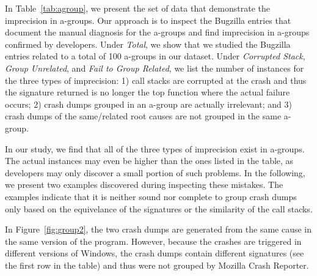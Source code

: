 \begin{table}[!htb]
\centering
\caption{Imprecision in a-Groups\label{tab:agroup}}

\end{table}

In Table~\ref{tab:agroup}, we present the set of data that demonstrate the imprecision in a-groups. Our approach is to inspect the Bugzilla entries that document the manual diagnosis for the a-groups and find imprecision in a-groups confirmed by developers. Under {\it Total}, we show that we studied the Bugzilla entries related to a total of 100 a-groups in our dataset. Under {\it Corrupted Stack}, {\it Group Unrelated}, and {\it Fail to Group Related}, we list the number of instances for the three types of imprecision: 1) call stacks are corrupted at the crash and thus the signature returned is no longer the top function where the actual failure occurs; 2) crash dumps grouped in an a-group are actually irrelevant; and 3) crash dumps of the same/related root causes are not grouped in the same a-group. 

In our study, we find that all of the three types of imprecision exist in a-groups. The actual instances may even be higher than the ones listed in the table, as developers may only discover a small portion of such problems. In the following, we present two examples discovered during inspecting these mistakes. The examples indicate that it is neither sound nor complete to group crash dumps only based on the equivelance of the signatures or the similarity of the call stacks.

In Figure~\ref{fig:group2}, the two crash dumps are generated from the same cause in the same version of the program. However, because the crashes are triggered in different versions of Windows, the crash dumps contain different signatures (see the first row in the table) and thus were not grouped by Mozilla Crash Reporter.

